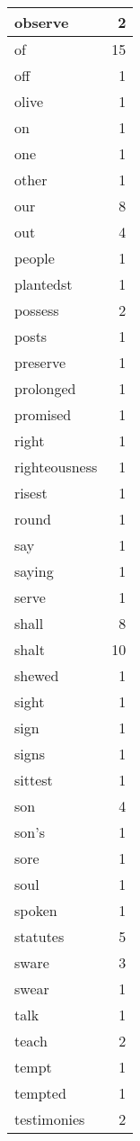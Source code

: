 \begin{center}
\begin{longtable}{l|r}
observe & 2 \\ \hline
of & 15 \\ \hline
off & 1 \\ \hline
olive & 1 \\ \hline
on & 1 \\ \hline
one & 1 \\ \hline
other & 1 \\ \hline
our & 8 \\ \hline
out & 4 \\ \hline
people & 1 \\ \hline
plantedst & 1 \\ \hline
possess & 2 \\ \hline
posts & 1 \\ \hline
preserve & 1 \\ \hline
prolonged & 1 \\ \hline
promised & 1 \\ \hline
right & 1 \\ \hline
righteousness & 1 \\ \hline
risest & 1 \\ \hline
round & 1 \\ \hline
say & 1 \\ \hline
saying & 1 \\ \hline
serve & 1 \\ \hline
shall & 8 \\ \hline
shalt & 10 \\ \hline
shewed & 1 \\ \hline
sight & 1 \\ \hline
sign & 1 \\ \hline
signs & 1 \\ \hline
sittest & 1 \\ \hline
son & 4 \\ \hline
son's & 1 \\ \hline
sore & 1 \\ \hline
soul & 1 \\ \hline
spoken & 1 \\ \hline
statutes & 5 \\ \hline
sware & 3 \\ \hline
swear & 1 \\ \hline
talk & 1 \\ \hline
teach & 2 \\ \hline
tempt & 1 \\ \hline
tempted & 1 \\ \hline
testimonies & 2 \\ \hline

\end{longtable}
\end{center}
